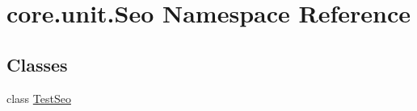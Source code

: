 \hypertarget{namespacecore_1_1unit_1_1Seo}{\section{core.\-unit.\-Seo Namespace Reference}
\label{namespacecore_1_1unit_1_1Seo}
}
\subsection*{Classes}
\begin{DoxyCompactItemize}
\item 
class \hyperlink{classcore_1_1unit_1_1Seo_1_1TestSeo}{Test\-Seo}
\end{DoxyCompactItemize}
